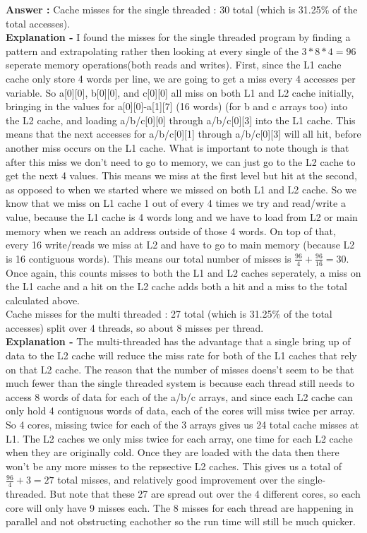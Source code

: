 \documentclass[a4paper,11pt]{article}
\newcommand{\answer}{\textbf{Answer : }}
\begin{document}
\answer 
Cache misses for the single threaded : 30 total (which is 31.25\% of the total accesses). \\
\textbf{Explanation - }I found the misses for the single threaded program by finding a pattern and extrapolating rather then looking at every single of the $3*8*4 = 96$ seperate memory operations(both reads and writes). First, since the L1 cache cache only store 4 words per line, we are going to get a miss every 4 accesses per variable. So a[0][0], b[0][0], and c[0][0] all miss on both L1 and L2 cache initially, bringing in the values for a[0][0]-a[1][7] (16 words) (for b and c arrays too) into the L2 cache, and loading a/b/c[0][0] through a/b/c[0][3] into the L1 cache. This means that the next accesses for a/b/c[0][1] through a/b/c[0][3] will all hit, before another miss occurs on the L1 cache. What is important to note though is that after this miss we don't need to go to memory, we can just go to the L2 cache to get the next 4 values. This means we miss at the first level but hit at the second, as opposed to when we started where we missed on both L1 and L2 cache. So we know that we miss on L1 cache 1 out of every 4 times we try and read/write a value, because the L1 cache is 4 words long and we have to load from L2 or main memory when we reach an address outside of those 4 words. On top of that, every 16 write/reads we miss at L2 and have to go to main memory (because L2 is 16 contiguous words). This means our total number of misses is $\frac{96}{4} + \frac{96}{16} = 30$. Once again, this counts misses to both the L1 and L2 caches seperately, a miss on the L1 cache and a hit on the L2 cache adds both a hit and a miss to the total calculated above. \\

Cache misses for the multi threaded : 27 total (which is 31.25\% of the total accesses) split over 4 threads, so about 8 misses per thread.     \\
\textbf{Explanation - } The multi-threaded has the advantage that a single bring up of data to the L2 cache will reduce the miss rate for both of the L1 caches that rely on that L2 cache. The reason that the number of misses doens't seem to be that much fewer than the single threaded system is because each thread still needs to access 8 words of data for each of the a/b/c arrays, and since each L2 cache can only hold 4 contiguous words of data, each of the cores will miss twice per array. So 4 cores, missing twice for each of the 3 arrays gives us 24 total cache misses at L1. The L2 caches we only miss twice for each array, one time for each L2 cache when they are originally cold. Once they are loaded with the data then there won't be any more misses to the repsective L2 caches. This gives us a total of $\frac{96}{4}+3 = 27$ total misses, and relatively good improvement over the single-threaded. But note that these 27 are spread out over the 4 different cores, so each core will only have 9 misses each. The 8 misses for each thread are happening in parallel and not obstructing eachother so the run time will still be much quicker.
\end{document}
